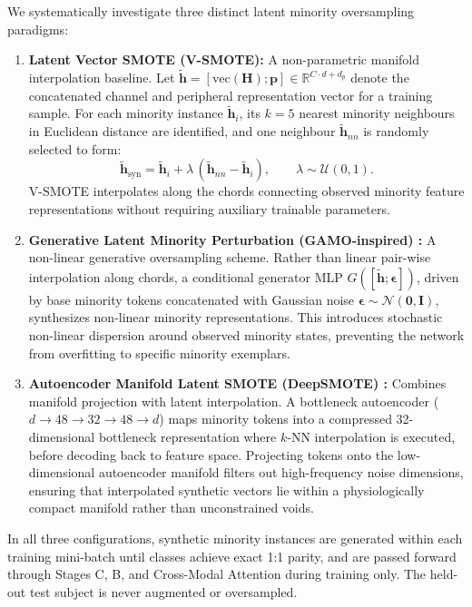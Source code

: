 \documentclass[a4paper,fleqn]{cas-sc}
\begin{document}
We systematically investigate three distinct latent minority oversampling paradigms:
\begin{enumerate}
\item \textbf{Latent Vector SMOTE (V-SMOTE):} A non-parametric manifold interpolation baseline. Let $\tilde{\mathbf{h}} = [\mathrm{vec}(\mathbf{H}); \mathbf{p}] \in \mathbb{R}^{C\cdot d + d_p}$ denote the concatenated channel and peripheral representation vector for a training sample. For each minority instance $\tilde{\mathbf{h}}_i$, its $k=5$ nearest minority neighbours in Euclidean distance are identified, and one neighbour $\tilde{\mathbf{h}}_{nn}$ is randomly selected to form:
\begin{equation}
\tilde{\mathbf{h}}_{\mathrm{syn}} = \tilde{\mathbf{h}}_i + \lambda\,(\tilde{\mathbf{h}}_{nn} - \tilde{\mathbf{h}}_i), \qquad \lambda \sim \mathcal{U}(0,1).
\end{equation}
V-SMOTE interpolates along the chords connecting observed minority feature representations without requiring auxiliary trainable parameters.
\item \textbf{Generative Latent Minority Perturbation (GAMO-inspired) \citep{mullick2019gamo}:} A non-linear generative oversampling scheme. Rather than linear pair-wise interpolation along chords, a conditional generator MLP $G([\tilde{\mathbf{h}}; \mathbf{\epsilon}])$, driven by base minority tokens concatenated with Gaussian noise $\mathbf{\epsilon}\sim\mathcal{N}(\mathbf{0}, \mathbf{I})$, synthesizes non-linear minority representations. This introduces stochastic non-linear dispersion around observed minority states, preventing the network from overfitting to specific minority exemplars.
\item \textbf{Autoencoder Manifold Latent SMOTE (DeepSMOTE) \citep{dablain2023deepsmote}:} Combines manifold projection with latent interpolation. A bottleneck autoencoder ($d \to 48 \to 32 \to 48 \to d$) maps minority tokens into a compressed 32-dimensional bottleneck representation where $k$-NN interpolation is executed, before decoding back to feature space. Projecting tokens onto the low-dimensional autoencoder manifold filters out high-frequency noise dimensions, ensuring that interpolated synthetic vectors lie within a physiologically compact manifold rather than unconstrained voids.
\end{enumerate}
In all three configurations, synthetic minority instances are generated within each training mini-batch until classes achieve exact 1:1 parity, and are passed forward through Stages C, B, and Cross-Modal Attention during training only. The held-out test subject is never augmented or oversampled.
\end{document}
